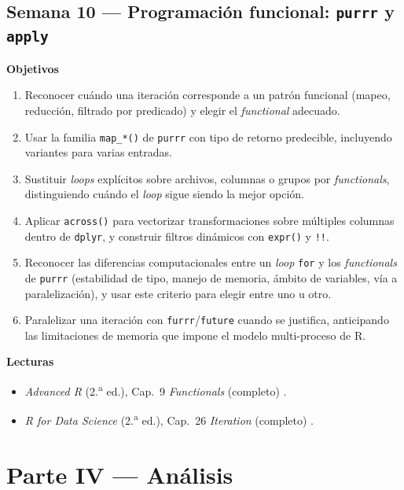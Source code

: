 \documentclass[11pt,letterpaper]{article}
\newcommand{\semanaSucinta}[2]{%
  \subsection*{\color{main}Semana #1 --- #2}%
}
\begin{document}
\semanaSucinta{10}{Programación funcional: \texttt{purrr} y \texttt{apply}}

\noindent\textbf{Objetivos}
\begin{enumerate}[leftmargin=*, itemsep=1pt]
    \item Reconocer cuándo una iteración corresponde a un patrón funcional (mapeo, reducción, filtrado por predicado) y elegir el \textit{functional} adecuado.
    \item Usar la familia \texttt{map\_*()} de \texttt{purrr} con tipo de retorno predecible, incluyendo variantes para varias entradas.
    \item Sustituir \textit{loops} explícitos sobre archivos, columnas o grupos por \textit{functionals}, distinguiendo cuándo el \textit{loop} sigue siendo la mejor opción.
    \item Aplicar \texttt{across()} para vectorizar transformaciones sobre múltiples columnas dentro de \texttt{dplyr}, y construir filtros dinámicos con \texttt{expr()} y \texttt{!!}.
    \item Reconocer las diferencias computacionales entre un \textit{loop} \texttt{for} y los \textit{functionals} de \texttt{purrr} (estabilidad de tipo, manejo de memoria, ámbito de variables, vía a paralelización), y usar este criterio para elegir entre uno u otro.
    \item Paralelizar una iteración con \texttt{furrr}/\texttt{future} cuando se justifica, anticipando las limitaciones de memoria que impone el modelo multi-proceso de R.
\end{enumerate}

\noindent\textbf{Lecturas}
\begin{itemize}[leftmargin=*, itemsep=1pt]
    \item \textit{Advanced R} (2.\textsuperscript{a} ed.), Cap.\ 9 \textit{Functionals} (completo) \cite{wickham2019advr}.
    \item \textit{R for Data Science} (2.\textsuperscript{a} ed.), Cap.\ 26 \textit{Iteration} (completo) \cite{wickham2023r4ds}.
\end{itemize}

\section*{\color{main}Parte IV --- Análisis}
\end{document}
